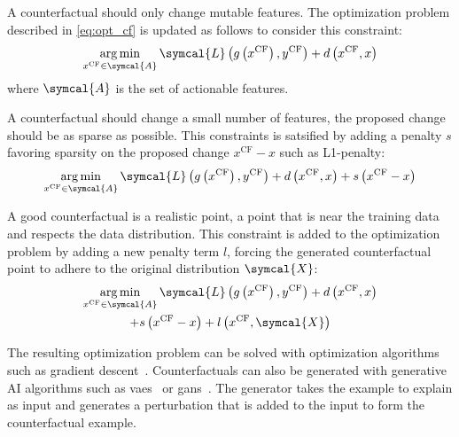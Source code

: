 \documentclass[../main.tex]{subfiles}
\begin{document}
	\begin{description}[
	    style=multiline,
	    leftmargin=!,
	    labelwidth=3cm,
	  ]
	  \item[Actionnability\label{item:cf_actionability}]
		  A counterfactual should only change mutable features.
		  The optimization problem described in \cref{eq:opt_cf} is updated as follows to consider this constraint:
		  \[\argmin_{x^{\text{CF}} \in \symcal{A}} \symcal{L}\left(g\left(x^{\text{CF}}\right), y^{\text{CF}} \right) + d\left(x^{\text{CF}}, x\right)\]
		  where \(\symcal{A}\) is the set of actionable features.
	  \item[Sparsity\label{item:cf_sparse}]
		  A counterfactual should change a small number of features, \ie{}the proposed change should be as sparse as possible.
		  This constraints is satsified by adding a penalty \(s\) favoring sparsity on the proposed change \(x^{\text{CF}} - x\) such as L1-penalty:
		  \begin{equation*}
		    \argmin_{x^{\text{CF}} \in \symcal{A}} \symcal{L}\left(g\left(x^{\text{CF}}\right), y^{\text{CF}} \right) + d\left(x^{\text{CF}}, x\right) + s\left(x^{\text{CF}}-x\right)
		  \end{equation*}
	  \item[Data manifold closeness\label{item:cf_data_manifold}]
		  A good counterfactual is a realistic point, a point that is near the training data and respects the data distribution.
		  This constraint is added to the optimization problem by adding a new penalty term \(l\), forcing the generated counterfactual point to adhere to the original distribution \(\symcal{X}\):
		  \begin{multline*}
		    \argmin_{x^{\text{CF}} \in \symcal{A}} \symcal{L}\left(g\left(x^{\text{CF}}\right), y^{\text{CF}} \right) + d\left(x^{\text{CF}}, x\right)\\ + s\left(x^{\text{CF}}-x\right) + l\left(x^{\text{CF}}, \symcal{X}\right)
		  \end{multline*}
	\end{description}
	The resulting optimization problem can be solved with optimization algorithms such as gradient descent~\cite{wachter2017counterfactual}.
	Counterfactuals can also be generated with generative AI algorithms such as \glspl{vae}~\cite{mahajan2020preservingcausalconstraintscounterfactual} or \glspl{gan}~\cite{CounteRGAN,vanlooveren2021conditionalgenerativemodelscounterfactual,Yang2021ModelBasedCS}.
	The generator takes the example to explain as input and generates a perturbation that is added to the input to form the counterfactual example.
\end{document}
